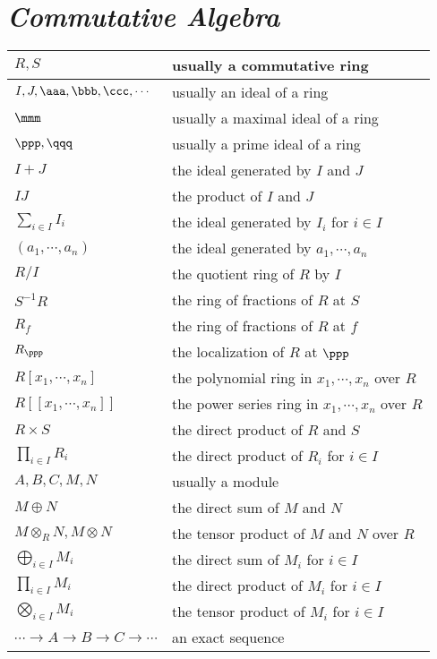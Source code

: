 
\section*{\emph{Commutative Algebra}}

\begin{longtable}{ll}
    \hline
    $R,S$ & usually a commutative ring \\ \hline
    $I,J,\aaa,\bbb,\ccc,\cdots$ & usually an ideal of a ring \\ \hline
    $\mmm$ & usually a maximal ideal of a ring \\ \hline
    $\ppp,\qqq$ & usually a prime ideal of a ring \\ \hline
    $I+J$ & the ideal generated by $I$ and $J$ \\ \hline
    $IJ$ & the product of $I$ and $J$ \\ \hline
    $\sum_{i\in I}{I_i}$ & the ideal generated by $I_i$ for $i\in I$ \\ \hline
    $(a_1,\cdots,a_n)$ & the ideal generated by $a_1,\cdots,a_n$ \\ \hline
    $R/I$ & the quotient ring of $R$ by $I$ \\ \hline
    $S^{-1}R$ & the ring of fractions of $R$ at $S$ \\ \hline
    $R_f$ & the ring of fractions of $R$ at $f$ \\ \hline
    $R_\ppp$ & the localization of $R$ at $\ppp$ \\ \hline
    $R[x_1,\cdots,x_n]$ & the polynomial ring in $x_1,\cdots,x_n$ over $R$ \\ \hline
    $R[\![x_1,\cdots,x_n]\!]$ & the power series ring in $x_1,\cdots,x_n$ over $R$ \\ \hline
    $R\times S$ & the direct product of $R$ and $S$ \\ \hline
    $\prod_{i\in I}{R_i}$ & the direct product of $R_i$ for $i\in I$ \\ \hline
    $A,B,C,M,N$ & usually a module \\ \hline
    $M\oplus N$ & the direct sum of $M$ and $N$ \\ \hline
    $M\otimes_RN,M\otimes N$ & the tensor product of $M$ and $N$ over $R$ \\ \hline
    $\bigoplus_{i\in I}{M_i}$ & the direct sum of $M_i$ for $i\in I$ \\ \hline
    $\prod_{i\in I}{M_i}$ & the direct product of $M_i$ for $i\in I$ \\ \hline
    $\bigotimes_{i\in I}{M_i}$ & the tensor product of $M_i$ for $i\in I$ \\ \hline
    $\cdots\rightarrow A\rightarrow B\rightarrow C\rightarrow\cdots$ & an exact sequence \\ \hline
\end{longtable}

